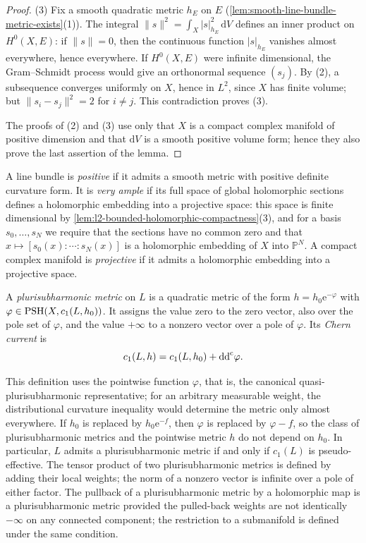 \begin{proof}
(3) Fix a smooth quadratic metric $h_E$ on $E$ (\cref{lem:smooth-line-bundle-metric-exists}(1)). The integral $\|s\|^2=\int_X|s|_{h_E}^2\,\mathrm dV$ defines an inner product on $H^0(X,E)$: if $\|s\|=0$, then the continuous function $|s|_{h_E}$ vanishes almost everywhere, hence everywhere. If $H^0(X,E)$ were infinite dimensional, the Gram--Schmidt process would give an orthonormal sequence $(s_j)$. By (2), a subsequence converges uniformly on $X$, hence in $L^2$, since $X$ has finite volume; but $\|s_i-s_j\|^2=2$ for $i\neq j$. This contradiction proves (3).

The proofs of (2) and (3) use only that $X$ is a compact complex manifold of positive dimension and that $\mathrm dV$ is a smooth positive volume form; hence they also prove the last assertion of the lemma.
\end{proof}

A line bundle is \emph{positive} if it admits a smooth metric with positive definite curvature form. It is \emph{very ample} if its full space of global holomorphic sections defines a holomorphic embedding into a projective space: this space is finite dimensional by \cref{lem:l2-bounded-holomorphic-compactness}(3), and for a basis $s_0,\ldots,s_N$ we require that the sections have no common zero and that $x\mapsto[s_0(x):\cdots:s_N(x)]$ is a holomorphic embedding of $X$ into $\mathbb P^N$. A compact complex manifold is \emph{projective} if it admits a holomorphic embedding into a projective space.

\begin{definition}\label{def:psh-quadratic-line-metric}
A \emph{plurisubharmonic metric} on $L$ is a quadratic metric of the form $h=h_0\mathrm e^{-\varphi}$ with $\varphi\in\mathrm{PSH}(X,c_1(L,h_0))$. It assigns the value zero to the zero vector, also over the pole set of $\varphi$, and the value $+\infty$ to a nonzero vector over a pole of $\varphi$. Its \emph{Chern current} is
\[
 c_1(L,h)=c_1(L,h_0)+\mathrm{dd}^{\mathrm{c}}\varphi.
\]
\end{definition}
This definition uses the pointwise function $\varphi$, that is, the canonical quasi-plurisubharmonic representative; for an arbitrary measurable weight, the distributional curvature inequality would determine the metric only almost everywhere. If $h_0$ is replaced by $h_0\mathrm e^{-f}$, then $\varphi$ is replaced by $\varphi-f$, so the class of plurisubharmonic metrics and the pointwise metric $h$ do not depend on $h_0$. In particular, $L$ admits a plurisubharmonic metric if and only if $c_1(L)$ is pseudo-effective. The tensor product of two plurisubharmonic metrics is defined by adding their local weights; the norm of a nonzero vector is infinite over a pole of either factor. The pullback of a plurisubharmonic metric by a holomorphic map is a plurisubharmonic metric provided the pulled-back weights are not identically $-\infty$ on any connected component; the restriction to a submanifold is defined under the same condition.

